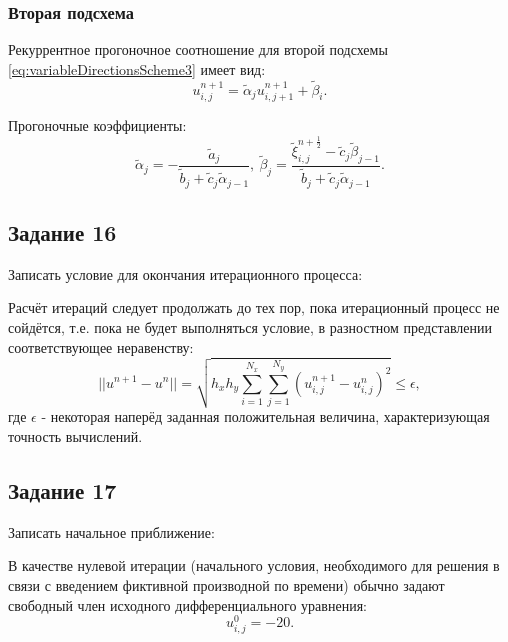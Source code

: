 \documentclass[12pt, a4paper]{report}
\begin{document}
	\subsubsection*{Вторая подсхема}
	\large
	Рекуррентное прогоночное соотношение для второй подсхемы \eqref{eq:variableDirectionsScheme3} имеет вид:
	\begin{equation*}
		u_{i, j}^{n+1} = \tilde{\alpha}_{j}u_{i, j+1}^{n+1} + \tilde{\beta}_{i}.
	\end{equation*}
	\par
	Прогоночные коэффициенты:
	\begin{equation*}
		\tilde{\alpha}_{j} = -\frac{\tilde{a}_{j}}{\tilde{b}_{j} + \tilde{c}_{j}\tilde{\alpha}_{j-1}}, \> \tilde{\beta}_{j} = \frac{\tilde{\xi}_{i, j}^{n+\frac{1}{2}} - \tilde{c}_{j}\tilde{\beta}_{j-1}}{\tilde{b}_{j} + \tilde{c}_{j}\tilde{\alpha}_{j-1}}.
	\end{equation*}

	\subsection*{Задание 16}
	\large
	Записать условие для окончания итерационного процесса: \par
	Расчёт итераций следует продолжать до тех пор, пока итерационный процесс не сойдётся, т.е. пока не будет выполняться условие, в разностном представлении соответствующее неравенству:
	\begin{equation*}
		\lvert \lvert u^{n+1} - u^{n} \rvert \rvert = \sqrt{h_{x}h_{y}\sum_{i=1}^{N_{x}}\sum_{j=1}^{N_{y}}(u_{i, j}^{n+1} - u_{i, j}^{n})^{2}} \le \epsilon,
	\end{equation*}
	где $\epsilon$ - некоторая наперёд заданная положительная величина, характеризующая точность вычислений.

	\subsection*{Задание 17}
	\large
	Записать начальное приближение: \par
	В качестве нулевой итерации (начального условия, необходимого для решения в связи с введением фиктивной производной по времени) обычно задают свободный член исходного дифференциального уравнения:
	\begin{equation*}
		u_{i, j}^{0} = -20.
	\end{equation*}
\end{document}
